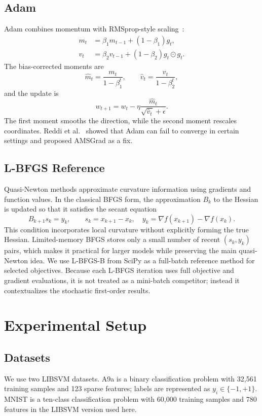 \documentclass{article}
\begin{document}
\subsection{Adam}
Adam combines momentum with RMSprop-style scaling~\citep{kingma2014adam}:
\begin{align}
    m_t &= \beta_1 m_{t-1}+(1-\beta_1)g_t,\\
    v_t &= \beta_2 v_{t-1}+(1-\beta_2)g_t\odot g_t.
\end{align}
The bias-corrected moments are
\begin{equation}
    \hat m_t = \frac{m_t}{1-\beta_1^t},\qquad
    \hat v_t = \frac{v_t}{1-\beta_2^t},
\end{equation}
and the update is
\begin{equation}
    w_{t+1} = w_t-\eta \frac{\hat m_t}{\sqrt{\hat v_t}+\epsilon}.
\end{equation}
The first moment smooths the direction, while the second moment rescales coordinates. Reddi et al.~\citep{reddi2018convergence} showed that Adam can fail to converge in certain settings and proposed AMSGrad as a fix.

\subsection{L-BFGS Reference}
Quasi-Newton methods approximate curvature information using gradients and function values. In the classical BFGS form, the approximation $B_k$ to the Hessian is updated so that it satisfies the secant equation
\begin{equation}
    B_{k+1}s_k = y_k,\qquad
    s_k=x_{k+1}-x_k,\quad y_k=\nabla f(x_{k+1})-\nabla f(x_k).
\end{equation}
This condition incorporates local curvature without explicitly forming the true Hessian. Limited-memory BFGS stores only a small number of recent $(s_k,y_k)$ pairs, which makes it practical for larger models while preserving the main quasi-Newton idea. We use L-BFGS-B from SciPy as a full-batch reference method for selected objectives. Because each L-BFGS iteration uses full objective and gradient evaluations, it is not treated as a mini-batch competitor; instead it contextualizes the stochastic first-order results.

\section{Experimental Setup}
\subsection{Datasets}
We use two LIBSVM datasets. A9a is a binary classification problem with 32,561 training samples and 123 sparse features; labels are represented as $y_i\in\{-1,+1\}$. MNIST is a ten-class classification problem with 60,000 training samples and 780 features in the LIBSVM version used here.
\end{document}
